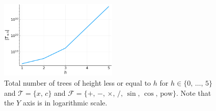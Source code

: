   \begin{figure}[ht!]
    \centering
    \includegraphics[width=0.5\textwidth]{img/theoretical_framework/t_leq.png}
    \caption{
      Total number of trees of height less or equal to \(h\) for \(h \in
      \{0,\, \ldots,\, 5\}\) and \(\mathcal{T} = \{x,\, c\}\) and \(\mathcal{F}
      = \{+,\, -,\, \times,\, /,\, \sin,\, \cos,\, \mathrm{pow}\}\).
      Note that the \(Y\) axis is in logarithmic scale.
    }
    \label{fig:bg:gp:repr_ev:leq_h_height_trees}
  \end{figure}
